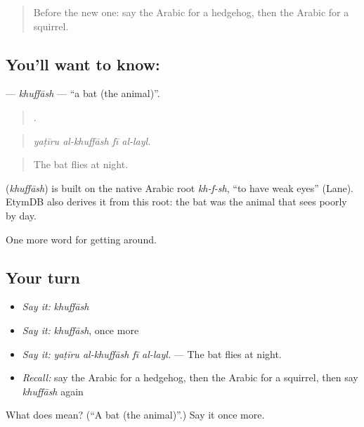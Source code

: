 \label{lesson:AR-C475-khuffash}



\begin{quote}
Before the new one: say the Arabic for a hedgehog, then the Arabic for a squirrel.
\end{quote}

\subsection*{You'll want to know: }
\textbf{} — \emph{khuffāsh} — \textquotedblleft{}a bat (the animal)\textquotedblright{}.

\begin{quote}
   .
\end{quote}

\begin{quote}
\emph{yaṭīru al-khuffāsh fī al-layl.}
\end{quote}

\begin{quote}
The bat flies at night.
\end{quote}

\begin{cousinweb}
\textbf{} (\emph{khuffāsh}) is built on the native Arabic root \emph{kh-f-sh}, \textquotedblleft{}to have weak eyes\textquotedblright{} (Lane). EtymDB also derives it from this root: the bat was the animal that sees poorly by day.
\end{cousinweb}

\begin{grammarlens}[title={What you've built}]
One more word for getting around.
\end{grammarlens}

\subsection*{Your turn}
\begin{itemize}
\raggedright
  \item \emph{Say it:} \emph{khuffāsh}
  \item \emph{Say it:} \emph{khuffāsh}, once more
  \item \emph{Say it:} \emph{yaṭīru al-khuffāsh fī al-layl.} — The bat flies at night.
  \item \emph{Recall:} say the Arabic for a hedgehog, then the Arabic for a squirrel, then say \emph{khuffāsh} again
\end{itemize}

\begin{tcolorbox}[breakable,colback=teal!4,colframe=teal!35!black,title={Before you move on}]
What does  mean? (\textquotedblleft{}A bat (the animal)\textquotedblright{}.) Say it once more.
\end{tcolorbox}
